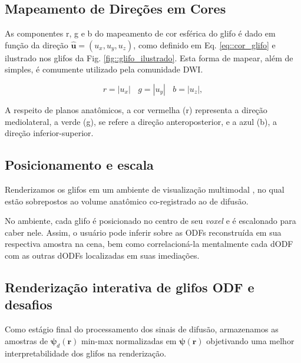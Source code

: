 \documentclass[
    12pt,                %
    oneside,            %
    a4paper,            %
    english,            %
    french,                %
    spanish,            %
    brazil                %
    ]{abntex2}
\begin{document}
\subsection{Mapeamento de Direções em Cores}

As componentes r, g e b do mapeamento de cor esférica do glifo é dado em função da direção $\mathbf{\hat{u}} = (u_x, u_y, u_z)$, como definido em Eq. \ref{eq::cor_glifo} e ilustrado nos glifos da Fig. \ref{fig::glifo_ilustrado}. Esta forma de mapear, além de simples, é comumente utilizado pela comunidade DWI. %

\begin{equation}
\label{eq::cor_glifo}
    r = |u_x| ~~~~ g = |u_y| ~~~~ b = |u_z|, 
\end{equation}


A respeito de planos anatômicos, a cor vermelha (r) representa a direção mediolateral, a verde (g), se refere a direção anteroposterior, e a azul (b), a direção inferior-superior.

\subsection{Posicionamento e escala}

Renderizamos os glifos em um ambiente de visualização multimodal \cite{VMTKNeuro}, no qual estão sobrepostos ao volume anatômico co-registrado ao de difusão.

No ambiente, cada glifo é posicionado no centro de seu \textit{voxel} e é escalonado para caber nele. Assim, o usuário pode inferir sobre as ODFs reconstruída em sua respectiva amostra na cena, bem como correlacioná-la mentalmente cada dODF com as outras dODFs localizadas em suas imediações.

\subsection{Renderização interativa de glifos ODF e desafios}

Como estágio final do processamento dos sinais de difusão, armazenamos as amostras de $\boldsymbol{\psi}_d(\mathbf{r})$ min-max normalizadas em $\boldsymbol{\psi}(\mathbf{r})$ objetivando uma melhor interpretabilidade dos glifos na renderização.
\end{document}
